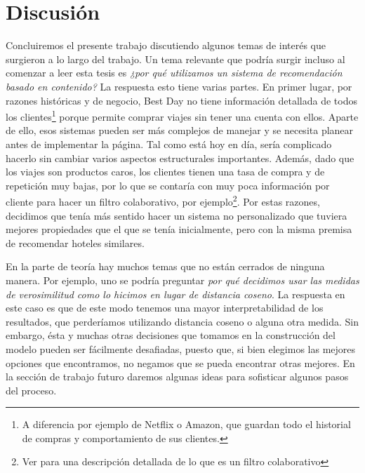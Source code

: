 \documentclass[12pt]{report}
\begin{document}

\clearpage
\section{Discusión}

Concluiremos el presente trabajo discutiendo algunos temas de interés que surgieron a lo largo del trabajo. Un tema relevante que podría surgir incluso al comenzar a leer esta tesis es \emph{¿por qué utilizamos un sistema de recomendación basado en contenido?} La respuesta esto tiene varias partes. En primer lugar, por razones históricas y de negocio, Best Day no tiene información detallada de todos los clientes\footnote{A diferencia por ejemplo de Netflix o Amazon, que guardan todo el historial de compras y comportamiento de sus clientes.} porque permite comprar viajes sin tener una cuenta con ellos. Aparte de ello, esos sistemas pueden ser más complejos de manejar y se necesita planear antes de implementar la página. Tal como está hoy en día, sería complicado hacerlo sin cambiar varios aspectos estructurales importantes. Además, dado que los viajes son productos caros, los clientes tienen una tasa de compra y de repetición muy bajas, por lo que se contaría con muy poca información por cliente para hacer un filtro colaborativo, por ejemplo\footnote{Ver \cite{mmds} para una descripción detallada de lo que es un filtro colaborativo}. Por estas razones, decidimos que tenía más sentido hacer un sistema no personalizado que tuviera mejores propiedades que el que se tenía inicialmente, pero con la misma premisa de recomendar hoteles similares.

En la parte de teoría hay muchos temas que no están cerrados de ninguna manera. Por ejemplo, uno se podría preguntar \emph{por qué decidimos usar las medidas de verosimilitud como lo hicimos en lugar de distancia coseno}. La respuesta en este caso es que de este modo tenemos una mayor interpretabilidad de los resultados, que perderíamos utilizando distancia coseno o alguna otra medida. Sin embargo, ésta y muchas otras decisiones que tomamos en la construcción del modelo pueden ser fácilmente desafiadas, puesto que, si bien elegimos las mejores opciones que encontramos, no negamos que se pueda encontrar otras mejores. En la sección de trabajo futuro daremos algunas ideas para sofisticar algunos pasos del proceso.
\end{document}
